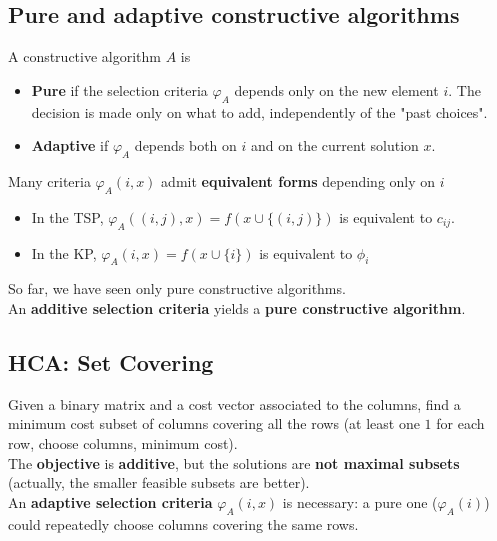 \newpage

\subsection{Pure and adaptive constructive algorithms}
A constructive algorithm $A$ is
\begin{itemize}
	\item \textbf{Pure} if the selection criteria $\varphi_A$ depends only on the new element $i$. The decision is made only on what to add, independently of the "past choices".\\
	
	\item \textbf{Adaptive} if $\varphi_A$ depends both on $i$ and on the current solution $x$.\\
\end{itemize}

Many criteria $\varphi_A (i, x)$ admit \textbf{equivalent forms} depending only on $i$
\begin{itemize}
	\item In the TSP, $\varphi_A ((i, j), x) = f (x \cup \{(i, j)\})$ is equivalent to $c_{ij}$.\\
	
	\item In the KP, $\varphi_A (i, x) = f (x \cup \{i\})$ is equivalent to $\phi_i$
\end{itemize}

So far, we have seen only pure constructive algorithms.\\

An \textbf{additive selection criteria} yields a \textbf{pure constructive algorithm}.\\

\newpage

\subsection{HCA: Set Covering}
Given a binary matrix and a cost vector associated to the columns, find a minimum cost subset of columns covering all the rows (at least one $1$ for each row, choose columns, minimum cost).\\

The \textbf{objective} is \textbf{additive}, but the solutions are \textbf{not maximal subsets} (actually, the smaller feasible subsets are better).\\

An \textbf{adaptive selection criteria} $\varphi_A (i, x)$ is necessary: a pure one ($\varphi_A (i)$) could repeatedly choose columns covering the same rows.\\

